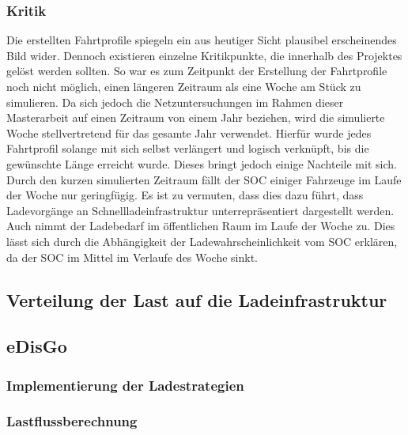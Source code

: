 


\subsubsection{Kritik}

Die erstellten Fahrtprofile spiegeln ein aus heutiger Sicht plausibel erscheinendes Bild wider.
Dennoch existieren einzelne Kritikpunkte, die innerhalb des \simbev Projektes gelöst werden sollten.
So war es zum Zeitpunkt der Erstellung der Fahrtprofile noch nicht möglich, einen längeren Zeitraum als eine Woche am Stück zu simulieren.
Da sich jedoch die Netzuntersuchungen im Rahmen dieser Masterarbeit auf einen Zeitraum von einem Jahr beziehen, wird die simulierte Woche stellvertretend für das gesamte Jahr verwendet.
Hierfür wurde jedes Fahrtprofil solange mit sich selbst verlängert und logisch verknüpft, bis die gewünschte Länge erreicht wurde.
Dieses bringt jedoch einige Nachteile mit sich.
Durch den kurzen simulierten Zeitraum fällt der \gls{SOC} einiger Fahrzeuge im Laufe der Woche nur geringfügig.
Es ist zu vermuten, dass dies dazu führt, dass Ladevorgänge an Schnellladeinfrastruktur un­ter­re­prä­sen­tiert dargestellt werden.
Auch nimmt der Ladebedarf im öffentlichen Raum im Laufe der Woche zu.
Dies lässt sich durch die Abhängigkeit der Ladewahrscheinlichkeit vom \gls{SOC} erklären, da der \gls{SOC} im Mittel im Verlaufe des Woche sinkt.


\subsection{Verteilung der Last auf die Ladeinfrastruktur}



\subsection{eDisGo}

\subsubsection{Implementierung der Ladestrategien}

\subsubsection{Lastflussberechnung}
